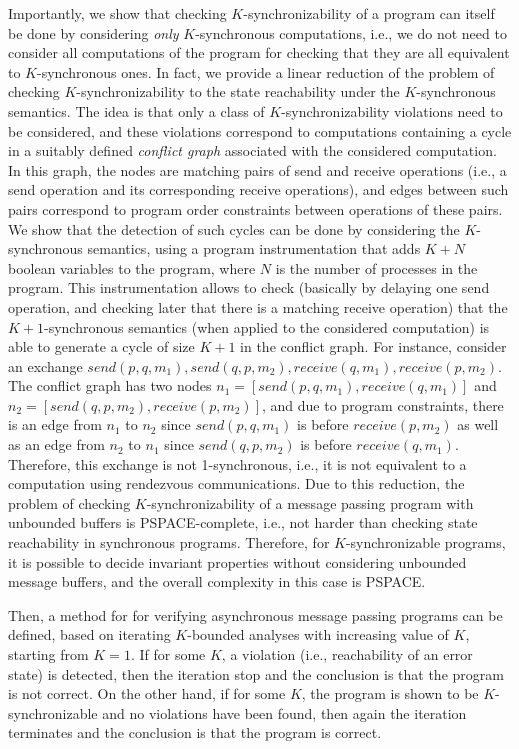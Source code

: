 Importantly, we show that checking $K$-synchronizability of a program can itself be done by considering {\em only} $K$-synchronous computations, i.e., we do not need to consider all computations of the program for checking that they are all equivalent to $K$-synchronous ones. In fact, we provide a linear reduction of the problem of checking $K$-synchronizability to the state reachability under the $K$-synchronous semantics. The idea is that only a class of $K$-synchronizability violations need to be considered, and these violations correspond to computations containing a cycle in a suitably defined {\em conflict graph} associated with the considered computation. In this graph, the nodes are matching pairs of send and receive operations (i.e., a send operation and its corresponding receive operations), and edges between such pairs correspond to program order constraints between operations of these pairs. We show that the detection of such cycles can be done by considering the $K$-synchronous semantics, using a program instrumentation that adds $K + N$ boolean variables to the program, where $N$ is the number of processes in the program. This instrumentation allows to check (basically by delaying one send operation, and checking later that there is a matching receive operation) that the $K+1$-synchronous semantics (when applied to the considered computation) is able to generate a cycle of size $K+1$ in the conflict graph. For instance, consider an exchange $send (p, q, m_1), send (q, p, m_2), receive (q, m_1), receive (p, m_2)$. The conflict graph has two nodes $n_1 = [ send(p, q, m_1), receive (q, m_1) ]$ and $n_2 = [ send(q, p, m_2), receive (p, m_2) ]$, and due to program constraints, there is an edge from $n_1$ to $n_2$ since $send(p, q, m_1)$ is before $receive (p, m_2)$ as well as an edge from $n_2$ to $n_1$ since $send(q, p, m_2)$ is before $receive (q, m_1)$. Therefore, this exchange is not 1-synchronous, i.e., it is not equivalent to a computation using rendezvous communications. 
Due to this reduction, the problem of checking $K$-synchronizability of a message passing program with unbounded buffers is PSPACE-complete, i.e., not harder than checking state reachability in synchronous programs. Therefore, for $K$-synchronizable programs, it is possible to decide invariant properties without considering unbounded message buffers, and the overall complexity in this case is PSPACE. 

Then, a method for for verifying asynchronous message passing programs can be defined, 
based on iterating $K$-bounded analyses with increasing value of $K$, starting from $K=1$. If for some $K$, a violation (i.e., reachability of an error state) is detected, then the iteration stop and the conclusion is that the program is not correct. On the other hand, if for some $K$, the program is shown to be $K$-synchronizable and no violations have been found, then again the iteration terminates and the conclusion is that the program is correct. 

